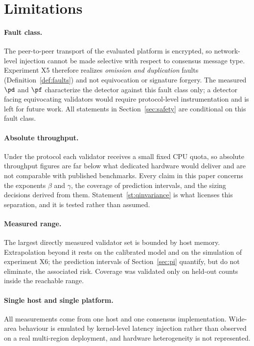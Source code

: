 \section{Limitations}
\label{sec:limitations}

\paragraph{Fault class.}
The peer-to-peer transport of the evaluated platform is encrypted, so
network-level injection cannot be made selective with respect to consensus
message type. Experiment X5 therefore realizes \emph{omission and duplication}
faults (Definition~\ref{def:faults}) and not equivocation or signature forgery.
The measured $\pd$ and $\pf$ characterize the detector against this fault class
only; a detector facing equivocating validators would require protocol-level
instrumentation and is left for future work. All statements in
Section~\ref{sec:safety} are conditional on this fault class.

\paragraph{Absolute throughput.}
Under the \RNM{} protocol each validator receives a small fixed CPU quota, so
absolute throughput figures are far below what dedicated hardware would deliver
and are not comparable with published benchmarks. Every claim in this paper
concerns the exponents $\beta$ and $\gamma$, the coverage of prediction
intervals, and the sizing decisions derived from them. Statement~\ref{st:qinvariance}
is what licenses this separation, and it is tested rather than assumed.

\paragraph{Measured range.}
The largest directly measured validator set is bounded by host memory.
Extrapolation beyond it rests on the calibrated model and on the
simulation of experiment X6; the prediction intervals of
Section~\ref{sec:pi} quantify, but do not eliminate, the associated risk.
Coverage was validated only on held-out counts inside the reachable range.

\paragraph{Single host and single platform.}
All measurements come from one host and one consensus implementation. Wide-area
behaviour is emulated by kernel-level latency injection rather than observed on
a real multi-region deployment, and hardware heterogeneity is not represented.

